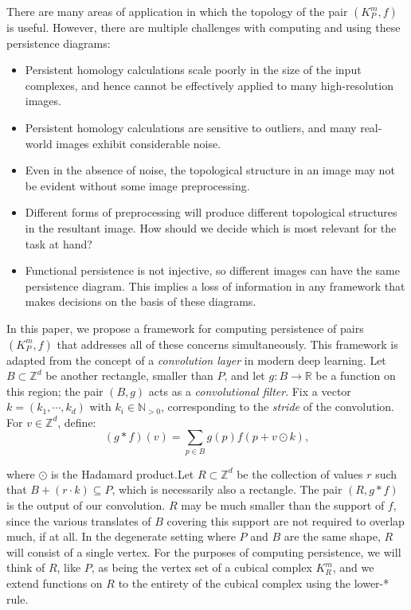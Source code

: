 \documentclass[conference]{IEEEtran}
\theoremstyle{definition}
\numberwithin{figure}{section}
\begin{document}
There are many areas of application in which the topology of the pair $(K^{m}_{P},f)$ is useful. However, there are multiple challenges with computing and using these persistence diagrams:
\begin{itemize}
	\item Persistent homology calculations scale poorly in the size of the input complexes, and hence cannot be effectively applied to many high-resolution images.
	\item Persistent homology calculations are sensitive to outliers, and many real-world images exhibit considerable noise.
	\item Even in the absence of noise, the topological structure in an image may not be evident without some image preprocessing.
	\item Different forms of preprocessing will produce different topological structures in the resultant image. How should we decide which is most relevant for the task at hand?
	\item Functional persistence is not injective, so different images can have the same persistence diagram. This implies a loss of information in any framework that makes decisions on the basis of these diagrams.
\end{itemize}

In this paper, we propose a framework for computing persistence of pairs $(K^{m}_{P},f)$ that addresses all of these concerns simultaneously. This framework is adapted from the concept of a \emph{convolution layer} in modern deep learning. Let $B \subset \mathbb{Z}^d$ be another rectangle, smaller than $P$, and let $g: B \to \mathbb{R}$ be a function on this region; the pair $(B,g)$ acts as a \emph{convolutional filter}. Fix a vector $k = (k_1, \cdots, k_d)$ with $k_i \in \mathbb{N}_{>0}$, corresponding to the \emph{stride} of the convolution. For $v \in \mathbb{Z}^d$, define:
\[(g \ast f)(v) = \sum_{p \in B} g(p)f(p+v \odot k),\]

where $\odot$ is the Hadamard product.Let $R \subset \mathbb{Z}^d$ be the collection of values $r$ such that $B + (r \cdot k) \subseteq P$, which is necessarily also a rectangle. The pair $(R, g \ast f)$ is the output of our convolution. $R$ may be much smaller than the support of $f$, since the various translates of $B$ covering this support are not required to overlap much, if at all. In the degenerate setting where $P$ and $B$ are the same shape, $R$ will consist of a single vertex. For the purposes of computing persistence, we will think of $R$, like $P$, as being the vertex set of a cubical complex $K_{R}^{m}$, and we extend functions on $R$ to the entirety of the cubical complex using the lower-* rule.\\
\end{document}
